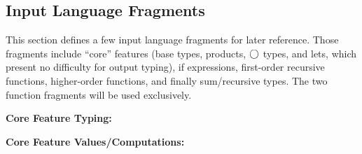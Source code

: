 \documentclass[]{article}
\newcommand {\next}{asdlfkj}
\begin{document}
\begin{abstrsyn}
\section{Input Language Fragments}

This section defines a few input language fragments for later reference.
Those fragments include ``core'' features (base types, products, $\bigcirc$ types, and lets, which present no difficulty for output typing), 
if expressions, first-order recursive functions, higher-order functions, and finally sum/recursive types.
The two function fragments will be used exclusively.

\begin{framed}
\noindent\textbf{Core Feature Typing:}
\end{framed}

\begin{framed}
\noindent\textbf{Core Feature Values/Computations:}
\end{framed}


\end{abstrsyn}
\end{document}
